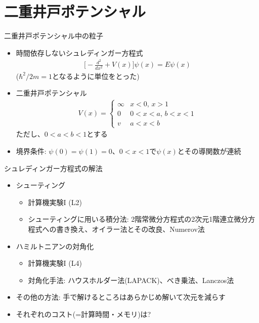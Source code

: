\section{二重井戸ポテンシャル}

\begin{frame}[t,fragile]{二重井戸ポテンシャル中の粒子}
  \begin{itemize}
  \item 時間依存しないシュレディンガー方程式
    \begin{align*}
      \big[ -\frac{d^2}{dx^2} + V(x) \big] \psi(x) = E \psi(x)
    \end{align*}
    ($\hbar^2/2m = 1$となるように単位をとった)
  \item 二重井戸ポテンシャル
    \begin{align*}
      V(x) = \begin{cases}
        \infty & \text{$x < 0$, $x > 1$} \\
        0 & \text{$0 < x < a$, $b < x < 1$} \\
        v & \text{$a < x < b$}
      \end{cases}
    \end{align*}
    ただし、$0<a<b<1$とする
  \item 境界条件: $\psi(0) = \psi(1) = 0$、$0 < x < 1$で$\psi(x)$とその導関数が連続
  \end{itemize}
\end{frame}

\begin{frame}[t,fragile]{シュレディンガー方程式の解法}
  \begin{itemize}
    \setlength{\itemsep}{1em}
  \item シューティング
    \begin{itemize}
    \item 計算機実験I (L2)
    \item シューティングに用いる積分法: 2階常微分方程式の2次元1階連立微分方程式への書き換え、オイラー法とその改良、Numerov法
    \end{itemize}
  \item ハミルトニアンの対角化
    \begin{itemize}
    \item 計算機実験I (L4)
    \item 対角化手法: ハウスホルダー法(LAPACK)、べき乗法、Lanczos法
    \end{itemize}
  \item その他の方法: 手で解けるところはあらかじめ解いて次元を減らす
  \item それぞれのコスト(=計算時間・メモリ)は?
  \end{itemize}
\end{frame}
